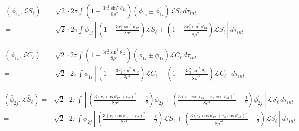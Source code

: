 \documentclass[Dissertation.tex]{subfiles}
\begin{document}
\begin{align}
\label{eq:DWavePhi1SBar}
\nonumber \left(\bar{\phi}_{1i},\mathcal{L} \bar{S}_\ell\right) = & \sqrt{2} \cdot 2\pi \int \left(1 - \frac{3 r_2^2 \sin^2\theta_{12}}{8 \rho^2} \right) \left(\phi_{1i} \pm \phi_{1i}^\prime \right) \mathscr{L}S_\ell \, d\tau_{int} \\
=& \sqrt{2} \cdot 2\pi \int \phi_{1i} \left[ \left(1 - \frac{3 r_2^2 \sin^2\theta_{12}}{8 \rho^2} \right) \mathscr{L}S_\ell \pm \left(1 - \frac{3 r_3^2 \sin^2\theta_{13}}{8 {\rho^\prime}^2} \right) \mathscr{L}S_\ell^\prime \right] d\tau_{int}
\end{align}

\begin{align}
\label{eq:DWavePhi1CBar}
\nonumber \left(\bar{\phi}_{1i},\mathcal{L} \bar{C}_\ell\right) = & \sqrt{2} \cdot 2\pi \int \left(1 - \frac{3 r_2^2 \sin^2\theta_{12}}{8 \rho^2} \right) \left(\phi_{1i} \pm \phi_{1i}^\prime \right) \mathscr{L}C_\ell \, d\tau_{int} \\
=& \sqrt{2} \cdot 2\pi \int \phi_{1i} \left[ \left(1 - \frac{3 r_2^2 \sin^2\theta_{12}}{8 \rho^2} \right) \mathscr{L}C_\ell \pm \left(1 - \frac{3 r_3^2 \sin^2\theta_{13}}{8 {\rho^\prime}^2} \right) \mathscr{L}C_\ell^\prime \right] d\tau_{int}
\end{align}


\begin{align}
\label{eq:DWavePhi2SBar}
\nonumber \left(\bar{\phi}_{2j},\mathcal{L} \bar{S}_\ell\right) = & \sqrt{2} \cdot 2\pi \int \left[ \left( \frac{3(r_1 \cos\theta_{12} + r_2)^2}{8 \rho^2} - \frac{1}{2} \right) \phi_{2j} \pm \left( \frac{3(r_1 \cos\theta_{13} + r_2 \cos\theta_{23})^2}{8 \rho^2} - \frac{1}{2} \right) \phi_{2j}^\prime \right] \mathscr{L}S_\ell \, d\tau_{int} \\
=& \sqrt{2} \cdot 2\pi \int \phi_{2j} \left[ \left( \frac{3(r_1 \cos\theta_{12} + r_2)^2}{8 \rho^2} - \frac{1}{2} \right) \mathscr{L}S_\ell \pm \left( \frac{3(r_1 \cos\theta_{12} + r_3 \cos\theta_{23})^2}{8 {\rho^\prime}^2} - \frac{1}{2} \right) \mathscr{L}S_\ell^\prime \right] d\tau_{int}
\end{align}
\end{document}
